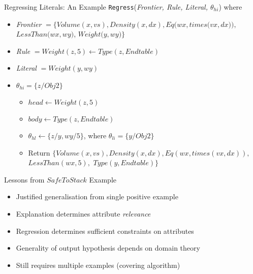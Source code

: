 \documentclass[%
pdf,
colorBG,
slideColor,
tcrico,
]{prosper}
\begin{document}
\begin{slide}{ Regressing Literals: An Example }
\tiny 
	\texttt{Regress}({\em Frontier, Rule, Literal, $\theta_{hi}$}) where
	\begin{itemize}
	\item[]{\em Frontier} $= \{ Volume(x,vs), Density(x,dx), Eq(wx,
	times(vx,$$dx)),$ $LessThan($$wx,$$wy)$, $Weight(y,$$wy) \}$
	\item[]{\em Rule} $= Weight(z,5) \gets Type(z,Endtable)$
	\item[]{\em Literal} $= Weight(y,wy)$
	\item[]$\theta_{hi} = \{z / Obj2 \}$
	\begin{itemize}
	\item $head \gets Weight(z,5)$
	\item $body \gets  Type(z,Endtable)$
	\item $\theta_{hl} \gets \{z / y, wy / 5 \}$, where $\theta_{li} = \{y / Obj2 \}$
	\item Return $\{ Volume(x,vs), Density(x,dx), Eq(wx, times(vx,dx)),$ $LessThan(wx,5),$ $Type(y,Endtable) \}$
	\end{itemize}
	\end{itemize}
\end{slide}


\begin{slide}{ Lessons from $SafeToStack$ Example }
	
	\begin{itemize}
	\item Justified generalisation from single positive example
	\item Explanation determines  attribute {\em relevance}
	\item Regression determines sufficient constraints on attributes
	\item Generality of output hypothesis depends on domain theory
	\item Still requires multiple examples (covering algorithm)
	\end{itemize}
\end{slide}


\end{document}
